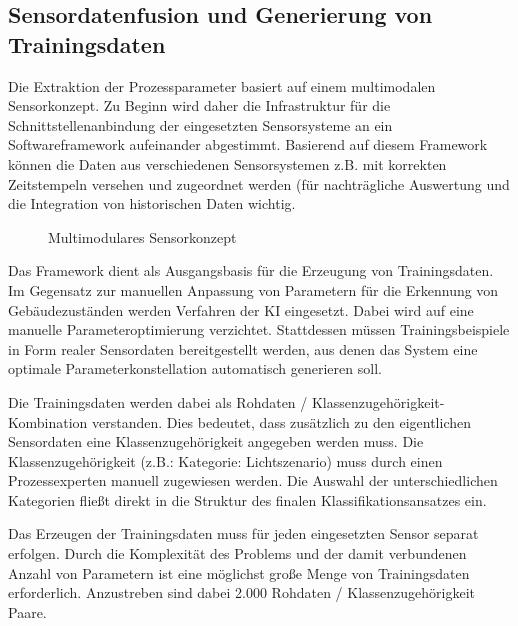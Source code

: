 \subsection{Sensordatenfusion und Generierung von Trainingsdaten}
Die Extraktion der Prozessparameter basiert auf einem multimodalen Sensorkonzept. Zu Beginn wird daher die Infrastruktur für die Schnittstellenanbindung der eingesetzten Sensorsysteme an ein Softwareframework aufeinander abgestimmt. Basierend auf diesem Framework können die Daten aus verschiedenen Sensorsystemen z.B. mit korrekten Zeitstempeln versehen und zugeordnet werden (für nachträgliche Auswertung und die Integration von historischen Daten wichtig.

\begin{figure}[htbp]
    \centering
    \caption{\label{fig-multi-kon}Multimodulares Sensorkonzept}
\end{figure}

Das Framework dient als Ausgangsbasis für die Erzeugung von Trainingsdaten. Im Gegensatz zur manuellen Anpassung von Parametern für die Erkennung von Gebäudezuständen werden Verfahren der \gls{KI} eingesetzt. Dabei wird auf eine manuelle Parameteroptimierung verzichtet. Stattdessen müssen Trainingsbeispiele in Form realer Sensordaten bereitgestellt werden, aus denen das System eine optimale Parameterkonstellation automatisch generieren soll.

Die Trainingsdaten werden dabei als Rohdaten / Klassenzugehörigkeit-Kombination verstanden. Dies bedeutet, dass zusätzlich zu den eigentlichen Sensordaten eine Klassenzugehörigkeit angegeben werden muss. Die Klassenzugehörigkeit (z.B.: Kategorie: Lichtszenario) muss durch einen Prozessexperten manuell zugewiesen werden. Die Auswahl der unterschiedlichen Kategorien fließt direkt in die Struktur des finalen Klassifikationsansatzes ein.

Das Erzeugen der Trainingsdaten muss für jeden eingesetzten Sensor separat erfolgen. Durch die Komplexität des Problems und der damit verbundenen Anzahl von Parametern ist eine möglichst große Menge von Trainingsdaten erforderlich. Anzustreben sind dabei 2.000 Rohdaten / Klassenzugehörigkeit Paare.

